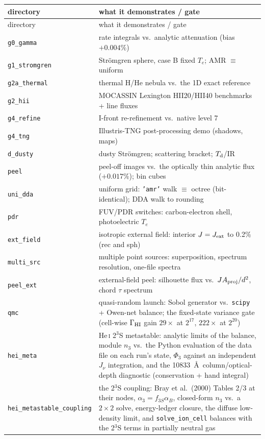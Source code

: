 \documentclass[english,a4paper]{my_memo}
\newcommand{\code}[1]{\texttt{#1}}
\begin{document}
{\small
\begin{longtable}{lp{10.2cm}}
\toprule
directory & what it demonstrates / gate \\
\midrule
\endfirsthead
\toprule
directory & what it demonstrates / gate \\
\midrule
\endhead
\bottomrule
\endlastfoot
\code{g0\_gamma} & rate integrals vs.\ analytic attenuation (bias $+0.004\%$) \\
\code{g1\_stromgren} & Str\"omgren sphere, case B fixed $T_e$; AMR $\equiv$ uniform \\
\code{g2a\_thermal} & thermal H/He nebula vs.\ the 1D exact reference \\
\code{g2\_hii} & MOCASSIN Lexington HII20/HII40 benchmarks + line fluxes \\
\code{g4\_refine} & I-front re-refinement vs.\ native level 7 \\
\code{g4\_tng} & Illustris-TNG post-processing demo (shadows, maps) \\
\code{d\_dusty} & dusty Str\"omgren; scattering bracket; $T_{\rm d}$/IR \\
\code{peel} & peel-off images vs.\ the optically thin analytic flux ($+0.017\%$); bin cubes \\
\code{uni\_dda} & uniform grid: \code{'amr'} walk $\equiv$ octree (bit-identical); DDA walk to rounding \\
\code{pdr} & FUV/PDR switches: carbon-electron shell, photoelectric $T_e$ \\
\code{ext\_field} & isotropic external field: interior $J = J_{\rm ext}$ to 0.2\% (rec and sph) \\
\code{multi\_src} & multiple point sources: superposition, spectrum resolution, one-file spectra \\
\code{peel\_ext} & external-field peel: silhouette flux vs.\ $J A_{\rm proj}/d^2$, chord $\tau$ spectrum \\
\code{qmc} & quasi-random launch: Sobol generator vs.\ \code{scipy} + Owen-net balance; the fixed-state variance gate (cell-wise $\Gamma_{\rm HI}$ gain $29\times$ at $2^{17}$, $222\times$ at $2^{20}$) \\
\code{hei\_meta} & He\,\textsc{i} 2$^3$S metastable: analytic limits of the balance, module $n_3$ vs.\ the Python evaluation of the data file on each run's state, $\Phi_3$ against an independent $J_\nu$ integration, and the 10833~\AA\ column/optical-depth diagnostic (conservation + hand integral) \\
\code{hei\_metastable\_coupling} & the 2$^3$S coupling: Bray et al.\ (2000) Tables 2/3 at their nodes, $\alpha_3 = f_{3S}\alpha_B$, closed-form $n_3$ vs.\ a $2\times2$ solve, energy-ledger closure, the diffuse low-density limit, and \code{solve\_ion\_cell} balances with the 2$^3$S terms in partially neutral gas \\

\end{longtable}}
\end{document}
